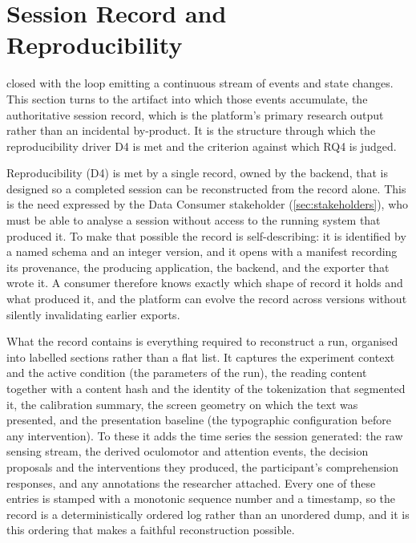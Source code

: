 \section{Session Record and Reproducibility}
\label{sec:design-data}
 closed with the loop emitting a continuous stream of events and state changes.
This section turns to the artifact into which those events accumulate, the authoritative session record, which is the platform's primary research output rather than an incidental by-product.
It is the structure through which the reproducibility driver D4 is met and the criterion against which RQ4 is judged.

Reproducibility (D4) is met by a single record, owned by the backend, that is designed so a completed session can be reconstructed from the record alone.
This is the need expressed by the Data Consumer stakeholder (\cref{sec:stakeholders}), who must be able to analyse a session without access to the running system that produced it.
To make that possible the record is self-describing: it is identified by a named schema and an integer version, and it opens with a manifest recording its provenance, the producing application, the backend, and the exporter that wrote it.
A consumer therefore knows exactly which shape of record it holds and what produced it, and the platform can evolve the record across versions without silently invalidating earlier exports.

What the record contains is everything required to reconstruct a run, organised into labelled sections rather than a flat list.
It captures the experiment context and the active condition (the parameters of the run), the reading content together with a content hash and the identity of the tokenization that segmented it, the calibration summary, the screen geometry on which the text was presented, and the presentation baseline (the typographic configuration before any intervention).
To these it adds the time series the session generated: the raw sensing stream, the derived oculomotor and attention events, the decision proposals and the interventions they produced, the participant's comprehension responses, and any annotations the researcher attached.
Every one of these entries is stamped with a monotonic sequence number and a timestamp, so the record is a deterministically ordered log rather than an unordered dump, and it is this ordering that makes a faithful reconstruction possible.

